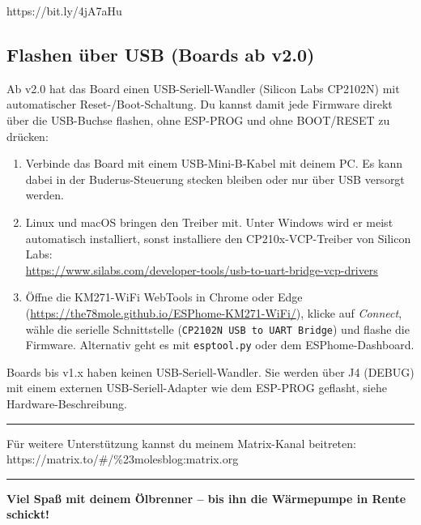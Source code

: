 \documentclass[
  9pt,
]{extarticle}
\providecommand{\tightlist}{%
  \setlength{\itemsep}{0pt}\setlength{\parskip}{0pt}}
\begin{document}
https://bit.ly/4jA7aHu

\subsection{Flashen über USB (Boards ab v2.0)}\label{flashen-usb}

Ab v2.0 hat das Board einen USB-Seriell-Wandler (Silicon Labs CP2102N)
mit automatischer Reset-/Boot-Schaltung. Du kannst damit jede Firmware
direkt über die USB-Buchse flashen, ohne ESP-PROG und ohne BOOT/RESET zu
drücken:

\begin{enumerate}
\tightlist
\item
  Verbinde das Board mit einem USB-Mini-B-Kabel mit deinem PC. Es kann
  dabei in der Buderus-Steuerung stecken bleiben oder nur über USB
  versorgt werden.
\item
  Linux und macOS bringen den Treiber mit. Unter Windows wird er meist
  automatisch installiert, sonst installiere den CP210x-VCP-Treiber von
  Silicon Labs:\\
  \url{https://www.silabs.com/developer-tools/usb-to-uart-bridge-vcp-drivers}
\item
  Öffne die KM271-WiFi WebTools in Chrome oder Edge
  (\url{https://the78mole.github.io/ESPhome-KM271-WiFi/}), klicke auf \emph{Connect},
  wähle die serielle Schnittstelle (\texttt{CP2102N USB to UART Bridge})
  und flashe die Firmware. Alternativ geht es mit \texttt{esptool.py}
  oder dem ESPhome-Dashboard.
\end{enumerate}

Boards bis v1.x haben keinen USB-Seriell-Wandler. Sie werden über J4
(DEBUG) mit einem externen USB-Seriell-Adapter wie dem ESP-PROG
geflasht, siehe Hardware-Beschreibung.

\begin{center}\rule{0.5\linewidth}{0.5pt}\end{center}

Für weitere Unterstützung kannst du meinem Matrix-Kanal beitreten:\\
https://matrix.to/\#/\%23molesblog:matrix.org

\begin{center}\rule{0.5\linewidth}{0.5pt}\end{center}

\textbf{Viel Spaß mit deinem Ölbrenner -- bis ihn die Wärmepumpe in
Rente schickt!}
\end{document}

